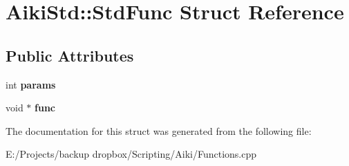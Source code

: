 \hypertarget{a00024}{\section{Aiki\+Std\+:\+:Std\+Func Struct Reference}
\label{a00024}
}
\subsection*{Public Attributes}
\begin{DoxyCompactItemize}
\item 
\hypertarget{a00024_a5edd90a27f903e18328f4d89e63253b6}{int {\bfseries params}}\label{a00024_a5edd90a27f903e18328f4d89e63253b6}

\item 
\hypertarget{a00024_a6d4f1ed3742f29094ab788cf4ba9f86c}{void $\ast$ {\bfseries func}}\label{a00024_a6d4f1ed3742f29094ab788cf4ba9f86c}

\end{DoxyCompactItemize}


The documentation for this struct was generated from the following file\+:\begin{DoxyCompactItemize}
\item 
E\+:/\+Projects/backup dropbox/\+Scripting/\+Aiki/Functions.\+cpp\end{DoxyCompactItemize}
